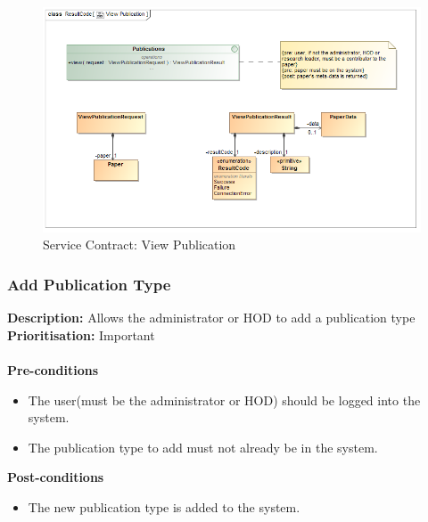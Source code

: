 \documentclass[a4paper]{article}
\begin{document}
            	\begin{figure}[H]
            		\centering
            		\includegraphics[width=\textwidth]{5.1.7.View.Publication.Services.Contract.png}
            		\caption{Service Contract: View Publication}
            	\end{figure}
    
\pagebreak

    \subsubsection{Add Publication Type}

    \textbf{Description:} Allows the administrator or HOD to add a publication type \\
        \textbf{Prioritisation:} Important\\
        \\
        
        
    \textbf{Pre-conditions}
     \begin{itemize}
        \item The user(must be the administrator or HOD) should be logged into the system.
        \item The publication type to add must not already be in the system.
   \end{itemize}
    
    \textbf{Post-conditions}
    \begin{itemize}
        \item The new publication type is added to the system.
    \end{itemize}
    
\end{document}
